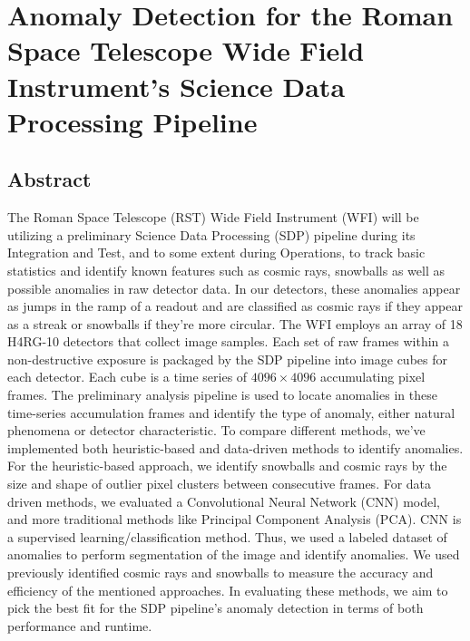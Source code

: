 \chapter[Anomaly Detection for the Roman Space Telescope Wide Field Instrument's Science Data Processing Pipeline]{Anomaly Detection for the Roman Space Telescope Wide Field Instrument's Science Data Processing Pipeline}

\section{Abstract}
The Roman Space Telescope (RST) Wide Field Instrument (WFI) will be utilizing a preliminary Science Data Processing (SDP) pipeline during its Integration and Test, and to some extent during Operations, to track basic statistics and identify known features such as cosmic rays, snowballs as well as possible anomalies in raw detector data. 
In our detectors, these anomalies appear as jumps in the ramp of a readout and are classified as cosmic rays if they appear as a streak or snowballs if they're more circular. 
The WFI employs an array of 18 H4RG-10 detectors that collect image samples.
Each set of raw frames within a non-destructive exposure is packaged by the SDP pipeline into image cubes for each detector.
Each cube is a time series of $4096 \times 4096$ accumulating pixel frames.
The preliminary analysis pipeline is used to locate anomalies in these time-series accumulation frames and identify the type of anomaly, either natural phenomena or detector characteristic.
To compare different methods, we've implemented both heuristic-based and data-driven methods to identify anomalies.
For the heuristic-based approach, we identify snowballs and cosmic rays by the size and shape of outlier pixel clusters between consecutive frames.
For data driven methods, we evaluated a Convolutional Neural Network (CNN) model, and more traditional methods like Principal Component Analysis (PCA).
CNN is a supervised learning/classification method. 
Thus, we used a labeled dataset of anomalies to perform segmentation of the image and identify anomalies. 
We used previously identified cosmic rays and snowballs to measure the accuracy and efficiency of the mentioned approaches. 
In evaluating these methods, we aim to pick the best fit for the SDP pipeline's anomaly detection in terms of both performance and runtime. 

